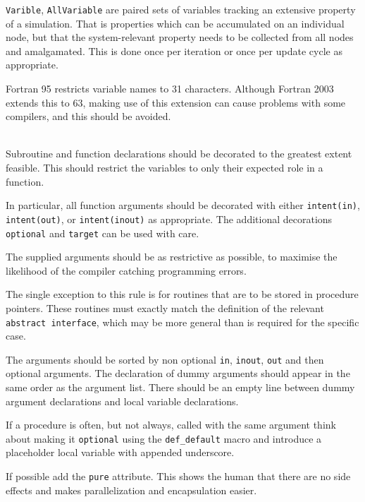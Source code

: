 \documentclass[a4paper,notitlepage]{scrreprt}
\newenvironment{packed_itemize}{
	\begin{itemize}
		\setlength{\itemsep}{1pt}
		\setlength{\parskip}{0pt}
		\setlength{\parsep}{0pt}
	}{\end{itemize}}
\newcommand\headitem[1]{\needspace{1.5\baselineskip}\item[{\boldmath #1 \nopagebreak}] \hfill \\ \nopagebreak}
\let\code\lstinline
\begin{document}
\begin{description}
\begin{packed_itemize}
			\item
				\code{Varible}, \code{AllVariable} are paired sets of
				variables tracking an extensive property of a simulation. That
				is properties which can be accumulated on an individual node,
				but that the system-relevant property needs to be collected
				from all nodes and amalgamated. This is done once per iteration
				or once per update cycle as appropriate.
		\end{packed_itemize}

		Fortran 95 restricts variable names to 31 characters. Although
		Fortran 2003 extends this to 63, making use of this extension can cause
		problems with some compilers, and this should be avoided.

	\headitem{Subroutine decoration (especially intent statements)}
		Subroutine and function declarations should be decorated to the
		greatest extent feasible. This should restrict the variables to only
		their expected role in a function.

		In particular, all function arguments should be decorated with either
		\code{intent(in)}, \code{intent(out)}, or
		\code{intent(inout)} as appropriate. The additional decorations
		\code{optional} and \code{target} can be used with care.

		The supplied arguments should be as restrictive as possible, to
		maximise the likelihood of the compiler catching programming errors.

		The single exception to this rule is for routines that are to be
		stored in procedure pointers. These routines must exactly match the
		definition of the relevant \code{abstract interface}, which may
		be more general than is required for the specific case.

    The arguments should be sorted by non optional
    \code{in}, \code{inout}, \code{out} and then optional arguments.
    The declaration of dummy arguments should appear in the same
    order as the argument list.
    There should be an empty line between dummy argument declarations
    and local variable declarations.

    If a procedure is often, but not always, called with the same argument
    think about making it \code{optional} using the \code{def_default}
    macro and introduce a placeholder local variable with appended
    underscore.

    If possible add the \code{pure} attribute.
    This shows the human that there are no side effects and makes
    parallelization and encapsulation easier.


\end{description}
\end{document}
